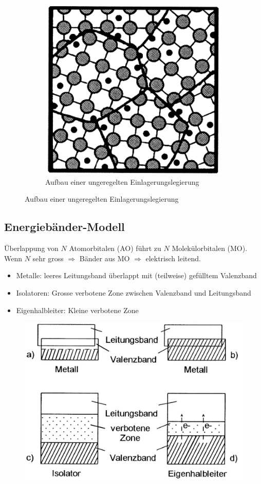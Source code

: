 \begin{figure}[htbp]
\begin{subfigure}{0.32\linewidth}
		\includegraphics[width=0.75\linewidth]{images/3_Ein_3.png}
		\caption{Aufbau einer ungeregelten Einlagerungslegierung}
	\end{subfigure}
\end{figure}

\subsection{Energiebänder-Modell}
Überlappung von $N$ Atomorbitalen (AO) führt zu $N$ Molekülorbitalen (MO). Wenn $N$ sehr gross $\Rightarrow$ Bänder aus MO $\Rightarrow$ elektrisch leitend.
\begin{itemize}
	\item Metalle: leeres Leitungsband überlappt mit (teilweise) gefülltem Valenzband
	\item Isolatoren: Grosse verbotene Zone zwischen Valenzband und Leitungsband
	\item Eigenhalbleiter: Kleine verbotene Zone
\end{itemize}

\begin{figure}[htbp]
	\centering
	\includegraphics[width=0.9\linewidth, height=0.5\linewidth]{images/3_Energieband.png}
\end{figure}

